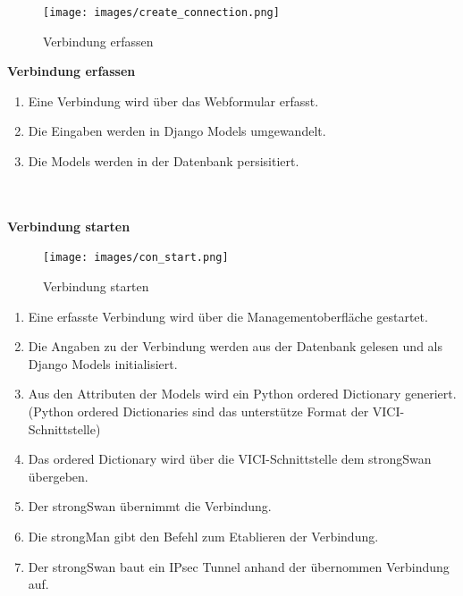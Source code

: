 \noindent\begin{minipage}[t]{0.4\textwidth}
\vspace{0pt}
    \begin{figure}[H]
    	\centering
    	\texttt{[image: images/create\_connection.png]}
    	\caption{Verbindung erfassen}
    \end{figure}
\end{minipage}
\hfill
\noindent\begin{minipage}[t]{0.6\textwidth}
\vspace{0pt}
\textbf{Verbindung erfassen}\
    \begin{enumerate}
        \item Eine Verbindung wird über das Webformular erfasst.
        \item Die Eingaben werden in Django Models umgewandelt.
        \item Die Models werden in der Datenbank persisitiert.
    \end{enumerate}
\end{minipage}
\hfill
\mbox{}\\\\
\textbf{Verbindung starten}
    \begin{figure}[H]
    	\centering
    	\texttt{[image: images/con\_start.png]}
    	\caption{Verbindung starten}
    \end{figure}
\begin{enumerate}
    \item Eine erfasste Verbindung wird über die Managementoberfläche gestartet.
    \item Die Angaben zu der Verbindung werden aus der Datenbank gelesen und als Django Models initialisiert.
    \item Aus den Attributen der Models wird ein Python ordered Dictionary generiert. (Python ordered Dictionaries sind das unterstütze Format der VICI-Schnittstelle)
    \item Das ordered Dictionary wird über die VICI-Schnittstelle dem strongSwan übergeben. 
    \item Der strongSwan übernimmt die Verbindung.
    \item Die strongMan gibt den Befehl zum Etablieren der Verbindung.
    \item Der strongSwan baut ein IPsec Tunnel anhand der übernommen Verbindung auf.
\end{enumerate}
\newpage


